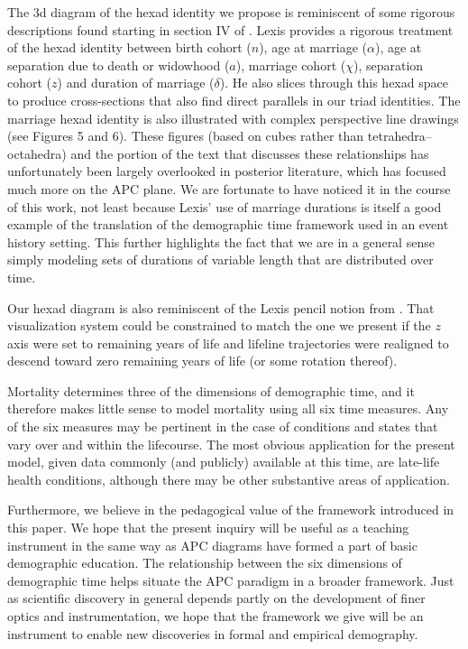 \documentclass[12pt,oneside,a4paper]{article} %
\begin{document}
The 3d diagram of the hexad identity we propose is reminiscent of some rigorous
descriptions found starting in section IV of \citet{lexis1875einleitung}. Lexis
provides a rigorous treatment of the hexad identity between birth cohort ($n$), age at
marriage ($\alpha$), age at separation due to death or widowhood ($a$), marriage cohort ($\chi$),
separation cohort ($z$) and duration of marriage ($\delta$). He also slices
through this hexad space to produce cross-sections that also find direct
parallels in our triad identities. The marriage hexad identity is also
illustrated with complex perspective line drawings (see Figures 5 and 6). These
figures (based on cubes rather than tetrahedra--octahedra) and the portion of
the text that discusses these relationships has unfortunately been largely
overlooked in posterior literature, which has focused much more on the APC
plane. We are fortunate to have noticed it in the course of this work, not least
because Lexis' use of marriage durations is itself a good example of the
translation of the demographic time framework used in an event history setting.
This further highlights the fact that we are in a general sense simply modeling sets of durations of variable length that are distributed over time. 

Our hexad diagram is also reminiscent of the Lexis pencil notion from
\citet{francis1996visualization}. That visualization system could be
constrained to match the one we present if the $z$ axis were set to remaining
years of life and lifeline trajectories were realigned to descend toward zero remaining years of life (or some rotation thereof).

Mortality determines three of the dimensions of
demographic time, and it therefore makes little sense to model mortality using
all six time measures. Any of the six measures may be pertinent in the case of
conditions and states that vary over and within the lifecourse. The most obvious application
for the present model, given data commonly (and publicly) available at this
time, are late-life health conditions, although there may be other substantive
areas of application. 

Furthermore, we believe in the pedagogical value of the framework
introduced in this paper. We hope that the
present inquiry will be useful as a teaching instrument in the same way as APC
diagrams have formed a part of basic demographic education.
The relationship between the six dimensions of demographic time helps situate the APC
paradigm in a broader framework. Just as scientific discovery in general
depends partly on the development of finer optics and instrumentation, we hope
that the framework we give will be an instrument to enable new discoveries
in formal and empirical demography.
\end{document}
